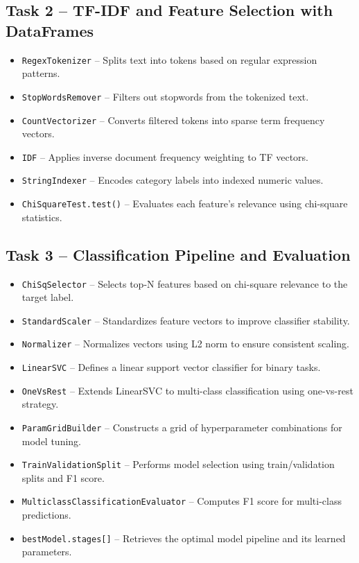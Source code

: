 \documentclass[12pt]{article}
\begin{document}
\subsection*{Task 2 – TF-IDF and Feature Selection with DataFrames}
\begin{itemize}
  \item \texttt{RegexTokenizer} – Splits text into tokens based on regular expression patterns.
  \item \texttt{StopWordsRemover} – Filters out stopwords from the tokenized text.
  \item \texttt{CountVectorizer} – Converts filtered tokens into sparse term frequency vectors.
  \item \texttt{IDF} – Applies inverse document frequency weighting to TF vectors.
  \item \texttt{StringIndexer} – Encodes category labels into indexed numeric values.
  \item \texttt{ChiSquareTest.test()} – Evaluates each feature's relevance using chi-square statistics.
\end{itemize}

\subsection*{Task 3 – Classification Pipeline and Evaluation}
\begin{itemize}
  \item \texttt{ChiSqSelector} – Selects top-N features based on chi-square relevance to the target label.
  \item \texttt{StandardScaler} – Standardizes feature vectors to improve classifier stability.
  \item \texttt{Normalizer} – Normalizes vectors using L2 norm to ensure consistent scaling.
  \item \texttt{LinearSVC} – Defines a linear support vector classifier for binary tasks.
  \item \texttt{OneVsRest} – Extends LinearSVC to multi-class classification using one-vs-rest strategy.
  \item \texttt{ParamGridBuilder} – Constructs a grid of hyperparameter combinations for model tuning.
  \item \texttt{TrainValidationSplit} – Performs model selection using train/validation splits and F1 score.
  \item \texttt{MulticlassClassificationEvaluator} – Computes F1 score for multi-class predictions.
  \item \texttt{bestModel.stages[]} – Retrieves the optimal model pipeline and its learned parameters.
\end{itemize}
\end{document}
